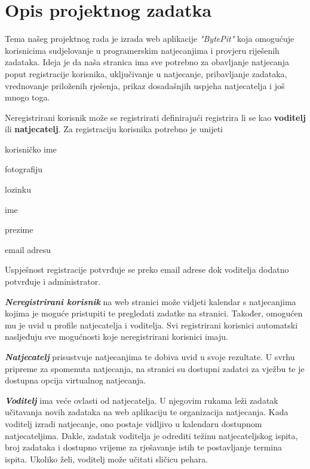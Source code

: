 \chapter{Opis projektnog zadatka}
		
		
		
		Tema našeg projektnog rada je izrada web aplikacije \textit{"BytePit"} koja omogućuje korisnicima sudjelovanje u programerskim natjecanjima i provjeru riješenih zadataka. Ideja je da naša stranica ima sve potrebno za obavljanje natjecanja poput registracije korisnika, uključivanje u natjecanje, pribavljanje zadataka, vrednovanje priloženih rješenja, prikaz dosadašnjih uspjeha natjecatelja i još mnogo toga.
	
		Neregistrirani korisnik može se registrirati definirajući registrira li se kao \textbf{voditelj} ili \textbf{natjecatelj}.
		Za registraciju korisnika potrebno je  unijeti \begin{packed_item}
			\item korisničko ime
			\item fotografiju
			\item lozinku
			\item ime
			\item prezime
			\item email adresu
		\end{packed_item}
		Uspješnost registracije potvrđuje se preko email adrese dok  voditelja dodatno potvrđuje i administrator.
		
		\textbf{\textit{Neregistrirani korisnik}} na web stranici može vidjeti kalendar s natjecanjima kojima je moguće pristupiti te pregledati zadatke na stranici. Također, omogućen mu je uvid u profile natjecatelja i voditelja. Svi registrirani korisnici automatski nasljeđuju sve mogućnosti koje neregistrirani korisnici imaju.
		
	    \textbf{\textit{Natjecatelj}} prisustvuje natjecanjima te dobiva uvid u svoje rezultate. U svrhu pripreme za spomenuta natjecanja, na stranici su dostupni zadatci za vježbu te je dostupna opcija virtualnog natjecanja.
	    
	    \textbf{\textit{Voditelj}} ima veće ovlasti od natjecatelja. U njegovim rukama leži zadatak učitavanja novih zadataka na web aplikaciju te organizacija natjecanja. Kada voditelj izradi natjecanje, ono postaje vidljivo u kalendaru dostupnom natjecateljima. Dakle, zadatak voditelja je odrediti težinu natjecateljskog ispita, broj zadataka i dostupno vrijeme za rješavanje istih te postavljanje termina ispita. Ukoliko želi, voditelj može učitati sličicu pehara.  
	    
